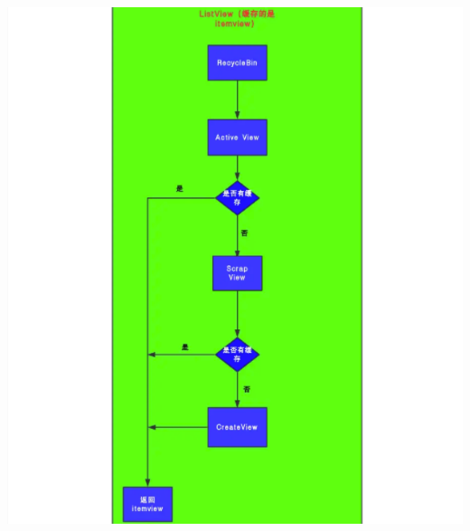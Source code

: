 \documentclass[9pt, b5paper]{article}
\begin{document}
\includegraphics[width=.9\linewidth]{./pic/listviewcache.png}
\end{document}
